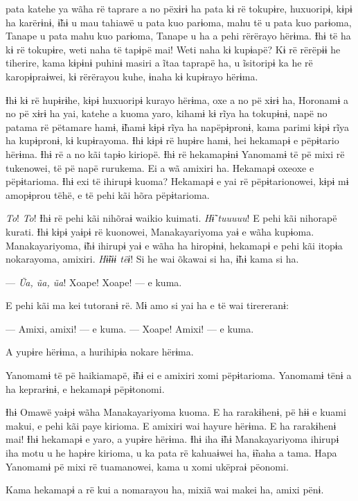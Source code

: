  pata katehe ya wãha rë taprare a no pëxɨrɨ ha pata kɨ rë tokupɨre,
huxuoripɨ, kɨpɨ ha karërɨnɨ, ɨ̃hɨ u mau tahiawë u pata kuo parɨoma, mahu
të u pata kuo parɨoma, Tanape u pata mahu kuo parɨoma, Tanape u ha a
pehi rërërayo hërɨma. Ɨhɨ të ha kɨ rë tokupɨre, weti naha të tapɨpë mai!
Weti naha kɨ kupɨapë? Kɨ rë rërëpɨɨ he tiherire, kama kɨpɨnɨ puhinɨ
masiri a ĩtaa taprapë ha, u ĩsitoripɨ ka he rë karopɨpraɨwei, kɨ
rërërayou kuhe, ɨnaha kɨ kupɨrayo hërɨma. 

Ɨhɨ kɨ rë hupɨrɨhe, kɨpɨ huxuoripɨ kurayo hërɨma, oxe a no pë xɨrɨ ha,
Horonamɨ a no pë xɨrɨ ha yai, katehe a kuoma yaro, kihamɨ kɨ rĩya ha
tokupɨnɨ, napë no patama rë pëtamare hamɨ, ɨ̃hamɨ kɨpɨ rĩya ha
napëpɨpronɨ, kama parimi kɨpɨ rĩya ha kupɨpronɨ, kɨ kupɨrayoma. Ɨhɨ kɨpɨ
rë hupɨre hamɨ, hei hekamapɨ e pëpɨtario hërɨma. Ɨhɨ rë a no kãi tapɨo
kiriopë. Ɨhɨ rë hekamapɨnɨ Yanomamɨ të pë mixi rë tukenowei, të pë napë
rurukema. Ei a wã amixiri ha. Hekamapɨ oxeoxe e pëpɨtarioma. Ɨhɨ exi të
ihirupɨ kuoma? Hekamapɨ e yai rë pëpɨtarionowei, kɨpɨ mɨ amopɨprou tëhë,
e të pehi kãi hõra pëpɨtarioma. 

\textit{To}! \textit{To}! Ɨhɨ rë pehi kãi nihõraɨ waikio kuimati. \textit{Hɨ̃ tuuuuu}! E pehi kãi
nihorapë kurati. Ɨhɨ kɨpɨ yaɨpɨ rë kuonowei, Manakayariyoma yaɨ e wãha
kupɨoma. Manakayariyoma, ɨ̃hɨ ihirupɨ yaɨ e wãha ha hiropɨnɨ, hekamapɨ e
pehi kãi itopɨa nokarayoma, amixiri. \textit{Hɨ̃ɨɨɨ tëɨ}! Si he wai õkawai si ha,
ɨ̃hɨ kama si ha. 

--- \textit{Ũa, ũa, ũa}! Xoape! Xoape! --- e kuma. 

E pehi kãi ma kei tutoranɨ rë. Mɨ amo si yai ha e të wai tirereranɨ:

--- Amixi, amixi! --- e kuma. --- Xoape! Amixi! --- e kuma. 

A yupɨre hërɨma, a hurihipɨa nokare hërɨma. 

Yanomamɨ të pë haikiamapë, ɨ̃hɨ ei e amixiri xomi pëpɨtarioma. Yanomamɨ
tënɨ a ha keprarɨnɨ, e hekamapɨ pëpɨtonomi. 

Ɨhɨ Omawë yaɨpɨ wãha Manakayariyoma kuoma. E ha rarakɨhenɨ, pë hɨɨ e
kuami makui, e pehi kãi paye kirioma. E amixiri wai hayure hërɨma. E ha
rarakɨhenɨ mai! Ɨhɨ hekamapɨ e yaro, a yupɨre hërɨma. Ɨhɨ iha ɨ̃hɨ
Manakayariyoma ihirupɨ iha motu u he hapɨre kirioma, u ka pata rë
kahuaɨwei ha, ɨ̃naha a tama. Hapa Yanomamɨ pë mixi rë tuamanowei, kama u
xomi ukëpraɨ pëonomi. 

Kama hekamapɨ a rë kui a nomarayou ha, mixiã wai makei ha, amixi pënɨ. 

